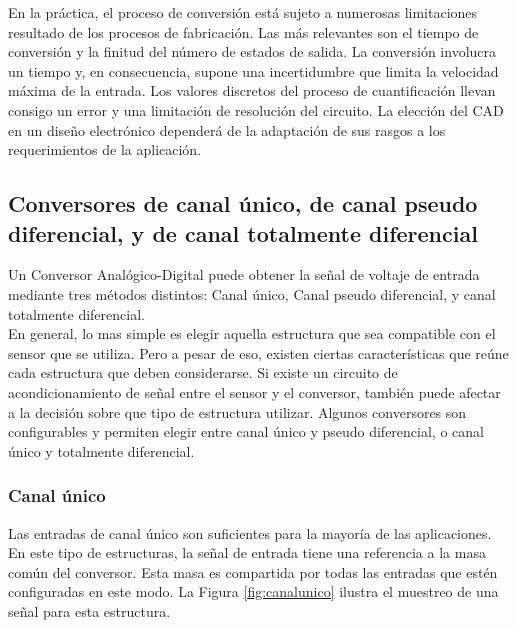 En la práctica, el proceso de conversión está sujeto a numerosas limitaciones resultado de los procesos de fabricación. Las más relevantes son el tiempo de conversión y la finitud del número de estados de salida. La conversión involucra un tiempo y, en consecuencia, supone  una  incertidumbre  que  limita  la  velocidad  máxima  de  la  entrada.  Los  valores discretos  del  proceso  de  cuantificación  llevan  consigo  un  error  y  una  limitación  de resolución del circuito. La elección del CAD en un diseño electrónico dependerá de la adaptación de sus rasgos a  los requerimientos de la aplicación. \cite{adc}




\subsection{Conversores de canal único, de canal pseudo diferencial, y de canal totalmente diferencial}
\label{sub:conversores_de_canal_unico_de_canal_pseudo_balanceado_y_de_canal_totalmente_balanceado}

Un Conversor Analógico-Digital puede obtener la señal de voltaje de entrada mediante tres métodos distintos: Canal único, Canal pseudo diferencial, y canal totalmente diferencial. \\

En general, lo mas simple es elegir aquella estructura que sea compatible con el sensor que se utiliza. Pero a pesar de eso, existen ciertas características que reúne cada estructura que deben considerarse. Si existe un circuito de acondicionamiento de señal entre el sensor y el conversor, también puede afectar a la decisión sobre que tipo de estructura utilizar. Algunos conversores son configurables y permiten elegir entre canal único y pseudo diferencial, o canal único y totalmente diferencial.\cite{tipos_canales}

\subsubsection{Canal único}
\label{subs:canal_unico}

Las entradas de canal único son suficientes para la mayoría de las aplicaciones. En este tipo de estructuras, la señal de entrada tiene una referencia a la masa común del conversor. Esta masa es compartida por todas las entradas que estén configuradas en este modo. La Figura \ref{fig:canalunico} ilustra el muestreo de una señal para esta estructura.

